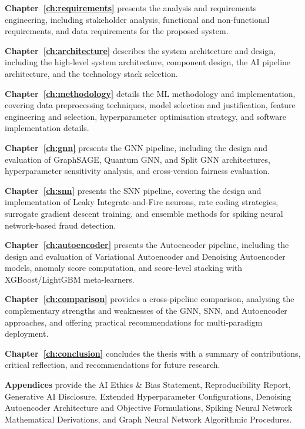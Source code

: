 \textbf{Chapter~\ref{ch:requirements}} presents the analysis and requirements engineering, including stakeholder analysis, functional and non-functional requirements, and data requirements for the proposed system.

\textbf{Chapter~\ref{ch:architecture}} describes the system architecture and design, including the high-level system architecture, component design, the AI pipeline architecture, and the technology stack selection.

\textbf{Chapter~\ref{ch:methodology}} details the ML methodology and implementation, covering data preprocessing techniques, model selection and justification, feature engineering and selection, hyperparameter optimisation strategy, and software implementation details.

\textbf{Chapter~\ref{ch:gnn}} presents the GNN pipeline, including the design and evaluation of GraphSAGE, Quantum GNN, and Split GNN architectures, hyperparameter sensitivity analysis, and cross-version fairness evaluation.

\textbf{Chapter~\ref{ch:snn}} presents the SNN pipeline, covering the design and implementation of Leaky Integrate-and-Fire neurons, rate coding strategies, surrogate gradient descent training, and ensemble methods for spiking neural network-based fraud detection.

\textbf{Chapter~\ref{ch:autoencoder}} presents the Autoencoder pipeline, including the design and evaluation of Variational Autoencoder and Denoising Autoencoder models, anomaly score computation, and score-level stacking with XGBoost/LightGBM meta-learners.

\textbf{Chapter~\ref{ch:comparison}} provides a cross-pipeline comparison, analysing the complementary strengths and weaknesses of the GNN, SNN, and Autoencoder approaches, and offering practical recommendations for multi-paradigm deployment.

\textbf{Chapter~\ref{ch:conclusion}} concludes the thesis with a summary of contributions, critical reflection, and recommendations for future research.

\textbf{Appendices} provide the AI Ethics \& Bias Statement, Reproducibility Report, Generative AI Disclosure, Extended Hyperparameter Configurations, Denoising Autoencoder Architecture and Objective Formulations, Spiking Neural Network Mathematical Derivations, and Graph Neural Network Algorithmic Procedures.

